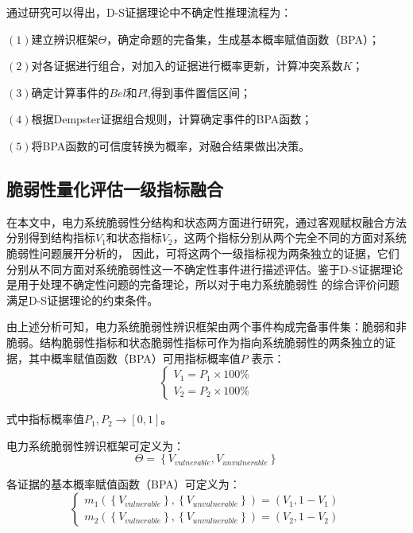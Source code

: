 通过研究可以得出，D-S证据理论中不确定性推理流程为：

$(1)$建立辨识框架$\Theta$，确定命题的完备集，生成基本概率赋值函数（BPA）；

$(2)$对各证据进行组合，对加入的证据进行概率更新，计算冲突系数$K$；

$(3)$确定计算事件的$Bel$和$Pl$,得到事件置信区间；

$(4)$根据Dempster证据组合规则，计算确定事件的BPA函数；

$(5)$将BPA函数的可信度转换为概率，对融合结果做出决策。

\subsection{脆弱性量化评估一级指标融合}
\label{sec:DSdistri}
在本文中，电力系统脆弱性分结构和状态两方面进行研究，通过客观赋权融合方法分别得到结构指标$V_1$和状态指标$V_2$，这两个指标分别从两个完全不同的方面对系统脆弱性问题展开分析的，
因此，可将这两个一级指标视为两条独立的证据，它们分别从不同方面对系统脆弱性这一不确定性事件进行描述评估。鉴于D-S证据理论是用于处理不确定性问题的完备理论，所以对于电力系统脆弱性
的综合评价问题满足D-S证据理论的约束条件。

由上述分析可知，电力系统脆弱性辨识框架由两个事件构成完备事件集：脆弱和非脆弱。结构脆弱性指标和状态脆弱性指标可作为指向系统脆弱性的两条独立的证据，其中概率赋值函数（BPA）可用指标概率值$P$
表示：
\begin{equation}
\left\{\begin{array}{l}{ V_1 = P_1 \times 100\%} \\ {V_2 = P_2 \times 100\%}\end{array}\right.
\end{equation}

式中指标概率值$P_1,P_2 \rightarrow \left[0,1\right]$。

电力系统脆弱性辨识框架可定义为：
\begin{equation}
  \Theta = \left\{V_{vulnerable},V_{unvulnerable}\right\}
\end{equation}

各证据的基本概率赋值函数（BPA）可定义为：
\begin{equation}
\left\{\begin{array}{l}{m_1(\left\{V_{vulnerable}\right\},\left\{V_{unvulnerable}\right\}) = (V_{1} , 1-V_{1})} \\ 
{m_2(\left\{V_{vulnerable}\right\},\left\{V_{unvulnerable}\right\}) = (V_{2} , 1-V_{2})}\end{array}\right.
\end{equation}

